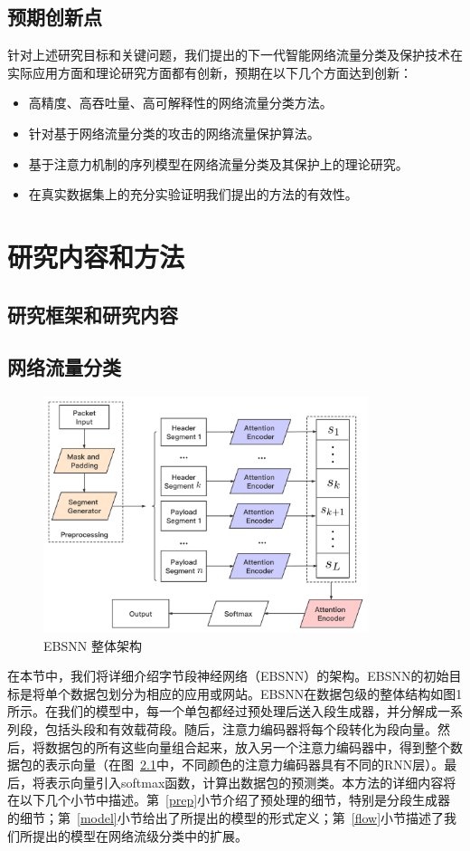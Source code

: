 \documentclass[degree=master,cjk-font=noto]{thuthesis}
\begin{document}
\section{预期创新点}

针对上述研究目标和关键问题，我们提出的下一代智能网络流量分类及保护技术在实际应用方面和理论研究方面都有创新，预期在以下几个方面达到创新：

\begin{itemize}
	\item 高精度、高吞吐量、高可解释性的网络流量分类方法。
	\item 针对基于网络流量分类的攻击的网络流量保护算法。
	\item 基于注意力机制的序列模型在网络流量分类及其保护上的理论研究。
	\item 在真实数据集上的充分实验证明我们提出的方法的有效性。
\end{itemize}


\chapter{研究内容和方法}

\section{研究框架和研究内容}

\section{网络流量分类}

\begin{figure}[!htp]
	\centerline{\includegraphics[width=9.5cm]{Overall_EBSNN.png}}
	\caption{EBSNN 整体架构}
	\label{fig1}
\end{figure}

在本节中，我们将详细介绍字节段神经网络（EBSNN）的架构。EBSNN的初始目标是将单个数据包划分为相应的应用或网站。EBSNN在数据包级的整体结构如图1所示。在我们的模型中，每一个单包都经过预处理后送入段生成器，并分解成一系列段，包括头段和有效载荷段。随后，注意力编码器将每个段转化为段向量。然后，将数据包的所有这些向量组合起来，放入另一个注意力编码器中，得到整个数据包的表示向量（在图~\ref{fig1}中，不同颜色的注意力编码器具有不同的RNN层）。最后，将表示向量引入softmax函数，计算出数据包的预测类。本方法的详细内容将在以下几个小节中描述。第~\ref{prep}小节介绍了预处理的细节，特别是分段生成器的细节；第~\ref{model}小节给出了所提出的模型的形式定义；第~\ref{flow}小节描述了我们所提出的模型在网络流级分类中的扩展。
\end{document}
